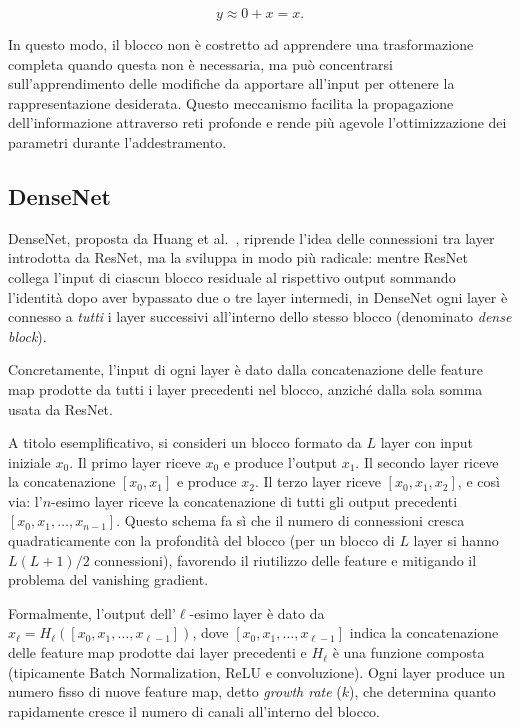 \begin{equation}
y \approx 0 + x = x.
\end{equation}

In questo modo, il blocco non è costretto ad apprendere una trasformazione completa quando questa non è necessaria, ma può concentrarsi sull'apprendimento delle modifiche da apportare all'input per ottenere la rappresentazione desiderata. Questo meccanismo facilita la propagazione dell'informazione attraverso reti profonde e rende più agevole l'ottimizzazione dei parametri durante l'addestramento.

\subsection{DenseNet}

DenseNet, proposta da Huang et al.~\cite{huang2018denselyconnectedconvolutionalnetworks}, riprende l'idea delle connessioni tra layer introdotta da ResNet, ma la sviluppa in modo più radicale: mentre ResNet collega l'input di ciascun blocco residuale al rispettivo output sommando l'identità dopo aver bypassato due o tre layer intermedi, in DenseNet ogni layer è connesso a \emph{tutti} i layer successivi all'interno dello stesso blocco (denominato \emph{dense block}).

Concretamente, l'input di ogni layer è dato dalla concatenazione delle feature map prodotte da tutti i layer precedenti nel blocco, anziché dalla sola somma usata da ResNet.

A titolo esemplificativo, si consideri un blocco formato da $L$ layer con input iniziale $x_0$. Il primo layer riceve $x_0$ e produce l'output $x_1$. Il secondo layer riceve la concatenazione $[x_0, x_1]$ e produce $x_2$. Il terzo layer riceve $[x_0, x_1, x_2]$, e così via: l'$n$-esimo layer riceve la concatenazione di tutti gli output precedenti $[x_0, x_1, \dots, x_{n-1}]$. Questo schema fa sì che il numero di connessioni cresca quadraticamente con la profondità del blocco (per un blocco di $L$ layer si hanno $L(L+1)/2$ connessioni), favorendo il riutilizzo delle feature e mitigando il problema del vanishing gradient.

Formalmente, l'output dell'$\ell$-esimo layer è dato da $x_\ell = H_\ell([x_0, x_1, \dots, x_{\ell-1}])$, dove $[x_0, x_1, \dots, x_{\ell-1}]$ indica la concatenazione delle feature map prodotte dai layer precedenti e $H_\ell$ è una funzione composta (tipicamente Batch Normalization, ReLU e convoluzione). Ogni layer produce un numero fisso di nuove feature map, detto \emph{growth rate} ($k$), che determina quanto rapidamente cresce il numero di canali all'interno del blocco.

